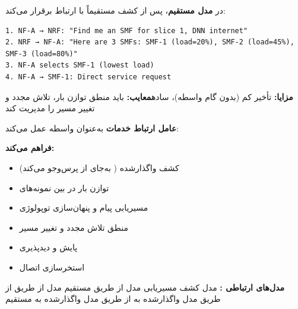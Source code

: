 

\CNchained{}

در \textbf{مدل مستقیم}،  پس از کشف مستقیماً با  ارتباط برقرار می‌کند:

\def\CNcodelang{}

\begin{CNplaincode}
\begin{Verbatim}
1. NF-A → NRF: "Find me an SMF for slice 1, DNN internet"
2. NRF → NF-A: "Here are 3 SMFs: SMF-1 (load=20%), SMF-2 (load=45%), SMF-3 (load=80%)"
3. NF-A selects SMF-1 (lowest load)
4. NF-A → SMF-1: Direct service request
\end{Verbatim}
\end{CNplaincode}

\textbf{مزایا:} تأخیر کم (بدون گام واسطه)، ساده\CNbr{}\textbf{معایب:}  باید منطق توازن بار، تلاش مجدد و تغییر مسیر را مدیریت کند



\textbf{عامل ارتباط خدمات } به‌عنوان واسطه عمل می‌کند:


\textbf{ فراهم می‌کند:}

\begin{itemize}
\tightlist
\item
  کشف واگذارشده ( به‌جای  از  پرس‌وجو می‌کند)
\item
  توازن بار در بین نمونه‌های 
\item
  مسیریابی پیام و پنهان‌سازی توپولوژی
\item
  منطق تلاش مجدد و تغییر مسیر
\item
  پایش و دیدپذیری
\item
  استخرسازی اتصال
\end{itemize}

\textbf{مدل‌های ارتباطی :}\CNbr{}\lr{\textbar{}} مدل \lr{\textbar{}} کشف \lr{\textbar{}} مسیریابی \lr{\textbar{}}\CNbr{}\CNbr{}\lr{\textbar{}} مدل  از طریق  \lr{\textbar{}} مستقیم  \lr{\textbar{}}\CNbr{}\lr{\textbar{}} مدل  از طریق  \lr{\textbar{}} از طریق  \lr{\textbar{}}\CNbr{}\lr{\textbar{}} مدل  \lr{\textbar{}} واگذارشده به  \lr{\textbar{}} از طریق  \lr{\textbar{}}\CNbr{}\lr{\textbar{}} مدل  \lr{\textbar{}} واگذارشده به  \lr{\textbar{}} مستقیم  \lr{\textbar{}}

